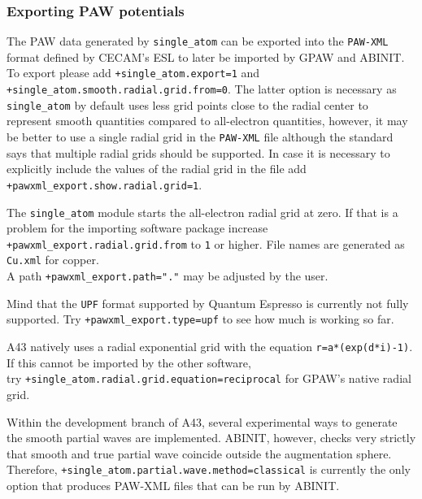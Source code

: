 \documentclass[oribibl]{llncs}
\newcommand{\ttt}[1]{\texttt{#1}}
\newcommand{\codename}{A43}
\begin{document}
\subsubsection{Exporting PAW potentials} \label{sec:single-atom-export}
%
The \ac{PAW} data generated by \ttt{single\_atom} can be exported into the \ttt{PAW-XML} format defined
by CECAM's ESL\cite{CECAM_Electronic_Structure_Library} 
to later be imported by GPAW\cite{gpaw} and ABINIT\cite{abinit}.
To export please add \ttt{+single\_atom.export=1} and \ttt{+single\_atom.smooth.radial.grid.from=0}.
The latter option is necessary as \ttt{single\_atom} by default uses less grid points close to the radial center 
to represent smooth quantities compared to all-electron quantities, 
however, it may be better to use a single radial grid in the \ttt{PAW-XML} file
although the standard says that multiple radial grids should be supported.
In case it is necessary to explicitly include the values of the radial grid in the file add 
\ttt{+pawxml\_export.show.radial.grid=1}.

\noindent
The \ttt{single\_atom} module starts the all-electron radial grid at zero.
If that is a problem for the importing software package increase \ttt{+pawxml\_export.radial.grid.from} to \ttt{1} or higher. File names are generated as \ttt{Cu.xml} for copper. \\
A path \ttt{+pawxml\_export.path="."} may be adjusted by the user. 

\noindent
Mind that the \ttt{UPF} format supported by Quantum Espresso\cite{qe} is currently not fully supported.
Try \ttt{+pawxml\_export.type=upf} to see how much is working so far.

\noindent
\codename{} natively uses a radial exponential grid with the equation \ttt{r=a*(exp(d*i)-1)}.
If this cannot be imported by the other software,\\
try \ttt{+single\_atom.radial.grid.equation=reciprocal} for GPAW's native radial grid.

\noindent
Within the development branch of \codename{}, several experimental ways to generate the smooth partial waves
are implemented. ABINIT, however, checks very strictly that smooth and true partial wave coincide outside the augmentation sphere. Therefore, \ttt{+single\_atom.partial.wave.method=classical} is currently the only option that produces PAW-XML files that can be run by ABINIT.
\end{document}
